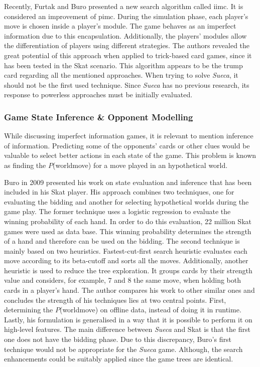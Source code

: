 Recently, Furtak and Buro \cite{Furtak} presented a new search algorithm called \gls{iimc}.
It is considered an improvement of \gls{pimc}.
During the simulation phase, each player's move is chosen inside a player's module.
The game behaves as an imperfect information due to this encapsulation.
Additionally, the players' modules allow the differentiation of players using different strategies.
The authors revealed the great potential of this approach when applied to trick-based card games, since it has been tested in the Skat scenario.
This algorithm appears to be the trump card regarding all the mentioned approaches.
When trying to solve \emph{Sueca}, it should not be the first used technique.
Since \emph{Sueca} has no previous research, its response to powerless approaches must be initially evaluated.





\subsubsection{Game State Inference \& Opponent Modelling}


While discussing imperfect information games, it is relevant to mention inference of information.
Predicting some of the opponents' cards or other clues would be valuable to select better actions in each state of the game.
This problem is known as finding the $P$(world\textbar move) for a move played in an hypothetical world.


Buro in 2009 \cite{Buro} presented his work on state evaluation and inference that has been included in his Skat player.
His approach combines two techniques, one for evaluating the bidding and another for selecting hypothetical worlds during the game play.
The former technique uses a logistic regression to evaluate the winning probability of each hand.
In order to do this evaluation, 22 million Skat games were used as data base.
This winning probability determines the strength of a hand and therefore can be used on the bidding.
The second technique is mainly based on two heuristics.
Fastest-cut-first search heuristic evaluates each move according to its beta-cutoff and sorts all the moves.
Additionally, another heuristic is used to reduce the tree exploration.
It groups cards by their strength value and considers, for example, 7 and 8 the same move, when holding both cards in a player's hand.
The author compares his work to other similar ones and concludes the strength of his techniques lies at two central points.
First, determining the $P$(world\textbar move) on offline data, instead of doing it in runtime.
Lastly, his formulation is generalised in a way that it is possible to perform it on high-level features.
The main difference between \emph{Sueca} and Skat is that the first one does not have the bidding phase.
Due to this discrepancy, Buro's first technique would not be appropriate for the \emph{Sueca} game.
Although, the search enhancements could be suitably applied since the game trees are identical.


